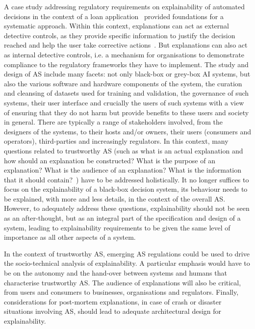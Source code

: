 \documentclass[sigconf,nonacm]{acmart}%
\begin{document}
	A case study addressing regulatory requirements on explainability of automated decisions in the context of a loan application~\cite{Huynh:DGOV21} provided foundations for a systematic approach. Within this context, explanations can act as external detective controls, as they provide specific information to justify the decision reached and help the user take corrective actions~\cite{Tsakalakis:CLSR21}. But explanations can also act as internal detective controls, i.e. a mechanism for organisations to demonstrate compliance to the regulatory frameworks they have to implement. 
	The study and design of AS include many facets: not only black-box or grey-box AI systems, but also the various software and hardware components of the system, the curation and cleansing of datasets used for training and validation, the governance of such systems, their user interface and crucially the users of such systems with a view of ensuring that they do not harm but provide benefits to these users and society in general. There are typically a range of stakeholders involved, from the designers of the systems, to their hosts and/or owners, their users (consumers and operators), third-parties and increasingly regulators. In this context, many questions related to trustworthy AS (such as what is an actual explanation and how should an explanation be constructed? What is the purpose of an explanation? What is the audience of an explanation? What is the information that it should contain?~\cite{Huynh:DGOV21,Tsakalakis:CLSR21}) have to be addressed holistically. It no longer suffices to focus on the explainability of a black-box decision system, its behaviour needs to be explained, with more and less details, in the context of the overall AS. However, to adequately address these questions, explainability should not be seen as an after-thought, but as an integral part of the specification and design of a system, leading to explainability requirements to be given the same level of importance as all other aspects of a system. 
	
	In the context of trustworthy AS, emerging AS regulations could be used to drive the socio-technical analysis of explainability. A particular emphasis would have to be on the autonomy and the hand-over between systems and humans that characterise trustworthy AS. The audience of explanations will also be critical, from users and consumers to businesses, organisations and regulators. Finally, considerations for post-mortem explanations, in case of crash or disaster situations involving AS, should lead to adequate architectural design for explainability.
	
\end{document}
